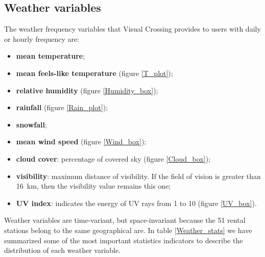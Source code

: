 \subsection{Weather variables}
The weather frequency variables that Visual Crossing provides to users with daily or hourly frequency are:
\begin{itemize}
	\item \textbf{mean temperature};
	\item \textbf{mean feels-like temperature} (figure \ref{T_plot});
	\item \textbf{relative humidity} (figure \ref{Humidity_box});
	\item \textbf{rainfall} (figure \ref{Rain_plot});
	\item \textbf{snowfall};
	\item \textbf{mean wind speed} (figure \ref{Wind_box});
	\item \textbf{cloud cover}: percentage of covered sky (figure \ref{Cloud_box});
	\item \textbf{visibility}: maximum distance of visibility. If the field of vision is greater than \SI{16}{\kilo\meter}, then the visibility value remains this one;
	\item \textbf{UV index}: indicates the energy of UV rays from \num{1} to \num{10} (figure \ref{UV_box}).
\end{itemize}
Weather variables are time-variant, but space-invariant because the \num{51} rental stations belong to the same geographical are. In table \ref{Weather_stats} we have summarized some of the most important statistics indicators to describe the distribution of each weather variable.

